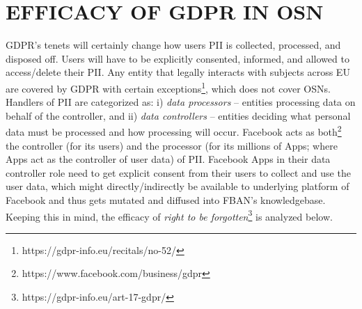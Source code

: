 \documentclass[runningheads]{llncs}
\begin{document}


\section{EFFICACY OF GDPR IN OSN}
\label{sec:efficacy}
\noindent GDPR's tenets will certainly change how users PII is
collected, processed, and disposed off. Users will have to be
explicitly consented, informed, and allowed to access/delete their
PII. Any entity that legally interacts with subjects across EU are
covered by GDPR with certain
exceptions\footnote{https://gdpr-info.eu/recitals/no-52/}, which does
not cover OSNs.  Handlers of PII are categorized as: i) \textit{data
  processors} -- entities processing data on behalf of the controller,
and ii) \textit{data controllers} -- entities deciding what personal
data must be processed and how processing will occur. Facebook acts as
both\footnote{https://www.facebook.com/business/gdpr} the controller
(for its users) and the processor (for its millions of Apps; where
Apps act as the controller of user data) of PII. Facebook Apps in
their data controller role need to get explicit consent from their
users to collect and use the user data, which might
directly/indirectly be available to underlying platform of Facebook
and thus gets mutated and diffused into FBAN's knowledgebase. Keeping
this in mind, the efficacy of \textit{right to be
  forgotten}\footnote{https://gdpr-info.eu/art-17-gdpr/} is analyzed
below.
\end{document}
